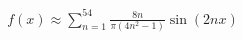 \documentclass[preview]{standalone}
\begin{document}
\begin{align*}
f(x) \approx \sum_{n=1}^{54} \frac{8n}{\pi(4n^2-1)} \sin(2nx)
\end{align*}
\end{document}
